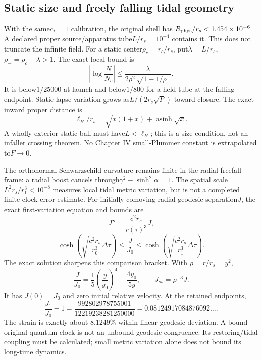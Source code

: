 \documentclass[10pt,twocolumn,letterpaper]{article}
\begin{document}
\subsection{Static size and freely falling tidal geometry}
With the same$c_*=1$ calibration, the original shell has
$R_{\rm phys}/r_s<1.454\times10^{-6}$. A declared proper source/apparatus
tube$L/r_s=10^{-4}$ contains it. This does not truncate the infinite field.
For a static center$\rho_c=r_c/r_s$, put$\lambda=L/r_s$,
$\rho_-=\rho_c-\lambda>1$. The exact local bound is
\[
 \left|\log\frac{N}{N_c}\right|
 \le\frac{\lambda}{2\rho_-^2\sqrt{1-1/\rho_-}}.
\]
It is below$1/25000$ at launch and below$1/800$ for a held tube at the
falling endpoint. Static lapse variation grows as$L/(2r_s\sqrt F)$ toward
closure. The exact inward proper distance is
\[
 \ell_H/r_s=\sqrt{x(1+x)}+\operatorname{asinh}\sqrt x.
\]
A wholly exterior static ball must have$L<\ell_H$; this is a size condition,
not an infaller crossing theorem. No Chapter IV small-Plummer constant is
extrapolated to$F\to0$.

The orthonormal Schwarzschild curvature remains finite in the radial
freefall frame: a radial boost cancels through$\gamma^2-\sinh^2\alpha=1$.
The spatial scale$L^2r_s/r_1^3<10^{-8}$ measures local tidal metric variation,
but is not a completed finite-clock error estimate. For initially comoving
radial geodesic separation$J$, the exact first-variation equation and bounds
are
\[
 J''=\frac{c^2r_s}{r(\tau)^3}J,
\]
\[
 \cosh\!\left(\sqrt{\frac{c^2r_s}{r_0^3}}\Delta\tau\right)
 \le\frac J{J_0}\le
 \cosh\!\left(\sqrt{\frac{c^2r_s}{r_1^3}}\Delta\tau\right).
\]
The exact solution sharpens this comparison bracket. With $\rho=r/r_s=y^2$,
\[
 \frac{J}{J_0}=\frac15\left(\frac y{y_0}\right)^4+\frac{4y_0}{5y},
 \qquad J_{ss}=\rho^{-3}J.
\]
It has $J(0)=J_0$ and zero initial relative velocity. At the retained endpoints,
\[
 \frac{J_1}{J_0}-1=\frac{992802978755001}{12219238281250000}
 =0.08124917084876092\ldots.
\]
The strain is exactly about $8.1249\%$ within linear geodesic deviation.\cite{ch5review}
A bound original quantum clock is not an unbound geodesic congruence. Its
restoring/tidal coupling must be calculated; small metric variation alone
does not bound its long-time dynamics.
\end{document}
